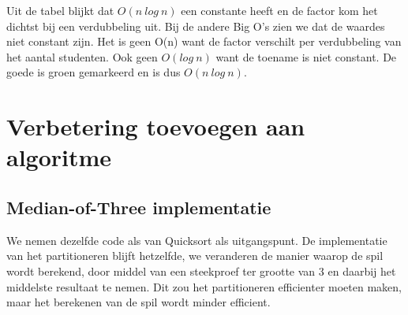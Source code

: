 \documentclass[12pt,notitlepage]{article}
\begin{document}
Uit de tabel blijkt dat $O(n\ log\ n)$ een constante heeft en de factor kom het dichtst bij een verdubbeling uit. Bij de andere Big O's zien we dat de waardes niet constant zijn. Het is geen O(n) want de factor verschilt per verdubbeling van het aantal studenten. Ook geen $O(log\ n)$ want de toename is niet constant. De goede is groen gemarkeerd en is dus $O(n\ log\ n)$.



\clearpage
\section{Verbetering toevoegen aan algoritme}

\subsection{Median-of-Three implementatie}

We nemen dezelfde code als van Quicksort als uitgangspunt.
De implementatie van het partitioneren blijft hetzelfde, we veranderen de manier waarop de spil wordt berekend, door middel van een steekproef ter grootte van 3 en daarbij het middelste resultaat te nemen. Dit zou het partitioneren efficienter moeten maken, maar het berekenen van de spil wordt minder efficient.
\end{document}

